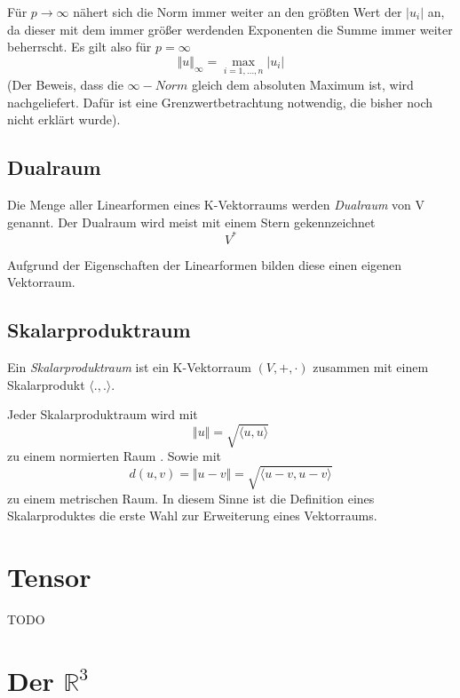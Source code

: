 Für $p \longrightarrow \infty$ nähert sich die Norm immer weiter an den größten Wert der $\vert u_i \vert$ an, da dieser mit dem immer größer werdenden Exponenten die Summe immer weiter beherrscht. Es gilt also für $p=\infty$
\[
\Vert u \Vert_\infty = \max_{i=1,\dots, n}  \vert u_i\vert
\]
(Der Beweis, dass die $\infty -Norm$ gleich dem absoluten Maximum ist, wird nachgeliefert. Dafür ist eine Grenzwertbetrachtung notwendig, die bisher noch nicht erklärt wurde).

\subsection{Dualraum}

\begin{definition}
Die Menge aller Linearformen eines K-Vektorraums werden \textsl{Dualraum} von V genannt. Der Dualraum wird meist mit einem Stern gekennzeichnet
\[V^* \]
\end{definition}

Aufgrund der Eigenschaften der Linearformen bilden diese einen eigenen Vektorraum. 

\subsection{Skalarproduktraum}

\begin{definition}\label{skpr}
Ein \textsl{Skalarproduktraum} ist ein K-Vektorraum $(V,+,\cdot)$ zusammen mit einem Skalarprodukt $\langle .,. \rangle$.
\end{definition}

Jeder Skalarproduktraum wird mit 
\[ \Vert u \Vert = \sqrt{\langle u,u \rangle} \]
zu einem normierten Raum . Sowie mit 
\[ 
d(u,v) = \Vert u-v \Vert = \sqrt{\langle u-v,u-v \rangle}
\]
zu einem metrischen Raum.  In diesem Sinne ist die Definition eines Skalarproduktes die erste Wahl zur Erweiterung eines Vektorraums. 



\section{Tensor}

TODO

\section{Der $\mathbb{R}^3$}

